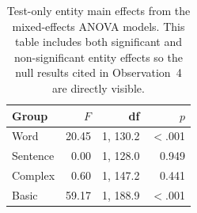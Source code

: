 \begin{table}[t]
\centering\small
\begin{tabular}{@{}lrrr@{}}
\toprule
\textbf{Group} & $F$ & \textbf{df} & $p$ \\
\midrule
Word & 20.45 & 1, 130.2 & $<$.001 \\
Sentence & 0.00 & 1, 128.0 & 0.949 \\
Complex & 0.60 & 1, 147.2 & 0.441 \\
Basic & 59.17 & 1, 188.9 & $<$.001 \\
\bottomrule
\end{tabular}
\caption{\small Test-only entity main effects from the mixed-effects ANOVA models. This table includes both significant and non-significant entity effects so the null results cited in Observation~4 are directly visible.}
\label{tab:test_entity_main_effects}
\end{table}
